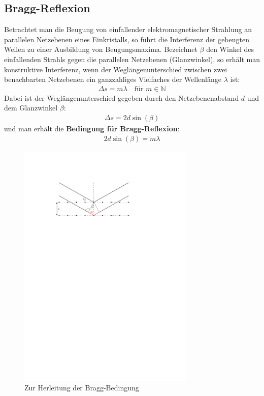 \documentclass[11pt, a4paper]{article}
\begin{document}
\subsection{Bragg-Reflexion}
Betrachtet man die Beugung von einfallender elektromagnetischer Strahlung an parallelen Netzebenen eines Einkristalls, so führt die Interferenz der gebeugten Wellen zu einer Ausbildung von Beugungsmaxima.
Bezeichnet $\beta$ den Winkel des einfallenden Strahls gegen die parallelen Netzebenen (Glanzwinkel), so erhält man konstruktive Interferenz, wenn der Weglängenunterschied zwischen zwei benachbarten Netzebenen ein ganzzahliges Vielfaches der Wellenlänge $\lambda$ ist:
\begin{align}
  \Delta s = m \lambda \quad \text{für } m \in \mathbb{N}
\end{align}
Dabei ist der Weglängenunterschied gegeben durch den Netzebenenabstand $d$ und dem Glanzwinkel $\beta$:
\begin{align}
  \Delta s = 2 d \sin(\beta)
\end{align}
und man erhält die \textbf{Bedingung für Bragg-Reflexion}:
\begin{align}
  2 d \sin(\beta) = m \lambda
  \label{eq:bragg}
\end{align}

\begin{figure}[h]
\centering
\includegraphics[width=0.75\textwidth]{./grafiken/bragg.pdf}
\caption{Zur Herleitung der Bragg-Bedingung}
\label{fig:bragg_bedingung}
\end{figure}
\end{document}
